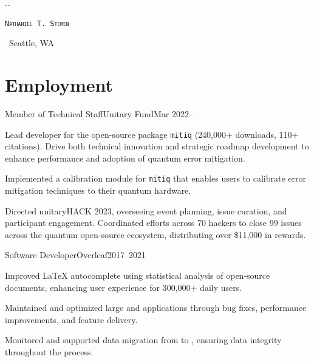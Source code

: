 \documentclass{cultvoucher}
\begin{document}
\begin{adjustwidth}{\dimexpr-\marginparsep-\marginparwidth}{}
	\begin{center}
		\textsc{\texttt{\HUGE Nathaniel T. Stemen}}

		 \separator{}\, Seattle, WA
	\end{center}
\end{adjustwidth}

\section{Employment}

\begin{entry}{Member of Technical Staff}{Unitary Fund}{Mar 2022--}
	\item Lead developer for the open-source  package \texttt{mitiq} (240,000+ downloads, 110+ citations).
		Drive both technical innovation and strategic roadmap development to enhance performance and adoption of quantum error mitigation.
	\item Implemented a calibration module for \texttt{mitiq} that enables users to calibrate error mitigation techniques to their quantum hardware.
    \item Directed unitaryHACK 2023, overseeing event planning, issue curation, and participant engagement.
		Coordinated efforts across 70 hackers to close 99 issues across the quantum open-source ecosystem, distributing over \$11,000 in rewards.
\end{entry}

\begin{entry}{Software Developer}{Overleaf}{2017--2021}
    \item Improved \LaTeX{} autocomplete using statistical analysis of open-source documents, enhancing user experience for 300,000+ daily users.
    \item Maintained and optimized large  and  applications through bug fixes, performance improvements, and feature delivery.
    \item Monitored and supported data migration from  to , ensuring data integrity throughout the process.
\end{entry}
\end{document}
